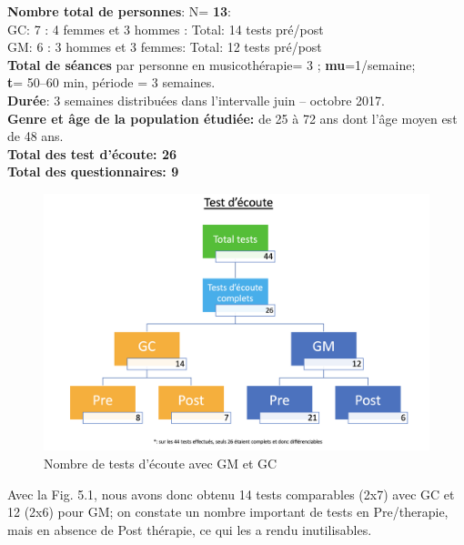 \textbf{Nombre total de personnes}: N=  \textbf{13}:
\\
	GC: 7 : 4 femmes et 3 hommes : Total: 14 tests pré/post
\\ 	
	GM: 6 : 3 hommes et 3 femmes: Total: 12 tests pré/post
	\\
\textbf{Total de séances} par personne en
   musicothérapie= 3 ;   \textbf{mu}=1/semaine;
   \\
 \textbf{t}= 50--60 min, période = 3 semaines.
 \\
  \textbf{Durée}: 3 semaines distribuées dans l'intervalle juin -- octobre 2017.
  \\
 \textbf{Genre et âge de la population étudiée:}  de 25 à 72
 ans dont l'âge moyen est de 48 ans.
 \\
 \textbf{Total  des test d'écoute: 26}
 \\
 \textbf{Total des questionnaires: 9}


\begin{figure}[th]
	\centering
	\includegraphics[width=0.7\linewidth]{images/graphiques/Testecoute.png}
	\caption{Nombre de tests d'écoute avec GM et GC}
	
\end{figure}
Avec la Fig. 5.1, nous avons donc obtenu 14 tests comparables (2x7) avec GC et 12 (2x6) 
pour GM; on 
constate 
un nombre important de tests en Pre/therapie, mais en absence de Post thérapie, ce qui les a rendu 
inutilisables.



